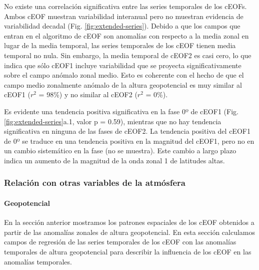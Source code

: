 \documentclass[12pt,oneside]{reedthesis}
\begin{document}
No existe una correlación significativa entre las series temporales de los cEOFs.
Ambos cEOF muestran variabilidad interanual pero no muestran evidencia de variabilidad decadal (Fig. \ref{fig:extended-series}).
Debido a que los campos que entran en el algoritmo de cEOF son anomalías con respecto a la media zonal en lugar de la media temporal, las series temporales de los cEOF tienen media temporal no nula.
Sin embargo, la media temporal de cEOF2 es casi cero, lo que indica que sólo cEOF1 incluye variabilidad que se proyecta significativamente sobre el campo anómalo zonal medio.
Esto es coherente con el hecho de que el campo medio zonalmente anómalo de la altura geopotencial es muy similar al cEOF1 (\(r^2\) = 98\%) y no similar al cEOF2 (\(r^2\) = 0\%).

Es evidente una tendencia positiva significativa en la fase 0º de cEOF1 (Fig. \ref{fig:extended-series}a.1, valor p = 0.59), mientras que no hay tendencia significativa en ninguna de las fases de cEOF2.
La tendencia positiva del cEOF1 de 0º se traduce en una tendencia positiva en la magnitud del cEOF1, pero no en un cambio sistemático en la fase (no se muestra).
Este cambio a largo plazo indica un aumento de la magnitud de la onda zonal 1 de latitudes altas.

\hypertarget{relaciuxf3n-con-otras-variables-de-la-atmuxf3sfera}{%
\subsubsection{Relación con otras variables de la atmósfera}\label{relaciuxf3n-con-otras-variables-de-la-atmuxf3sfera}}

\hypertarget{geopotencial}{%
\paragraph{Geopotencial}\label{geopotencial}}

En la sección anterior mostramos los patrones espaciales de los cEOF obtenidos a partir de las anomalías zonales de altura geopotencial.
En esta sección calculamos campos de regresión de las series temporales de los cEOF con las anomalías temporales de altura geopotencial para describir la influencia de los cEOF en las anomalías temporales.
\end{document}
